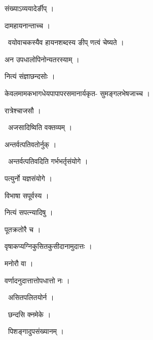 \documentclass[10pt, openany, oneside]{book}
\begin{document}
\noindent संख्याऽव्ययादेर्ङीप् ।

\noindent दामहायनान्ताच्च ।

\par\noindent\hspace{1.5em}{\vps वा॰}~{\qt वयोवाचकस्यैव हायनशब्दस्य ङीप् णत्वं चेष्यते ।}

\noindent अन उपधालोपिनोन्यतरस्याम् ।

\noindent नित्यं संज्ञाछन्दसोः ।

\noindent केवलमामकभागधेयपापापरसमानार्यकृत- सुमङ्गलभेषजाच्च ।

\noindent रात्रेश्चाजसौ ।

\par\noindent\hspace{1.5em}{\vps वा॰}~{\qt अजसादिष्विति वक्तव्यम् ।}

\noindent अन्तर्वत्पतिवतोर्नुक् ।

\par\noindent\hspace{1.5em}{\vps वा॰}~{\qt अन्तर्वत्पतिवदिति गर्भभर्तृसंयोगे ।}

\noindent पत्युर्नो यज्ञसंयोगे ।

\noindent विभाषा सपूर्वस्य ।

\noindent नित्यं सपत्न्यादिषु ।

\noindent पूतक्रतोरै च ।

\noindent वृषाकप्यग्निकुसितकुसीदानामुदात्तः ।

\noindent मनोरौ वा ।

\noindent वर्णादनुदात्तात्तोपधात्तो नः ।

\par\noindent\hspace{1.5em}{\vps वा॰}~{\qt असितपलितयोर्न ।}

\par\noindent\hspace{1.5em}{\vps वा॰}~{\qt छन्दसि क्नमेके ।}

\par\noindent\hspace{1.5em}{\vps वा॰}~{\qt पिशङ्गादुपसंख्यानम् ।}
\end{document}
